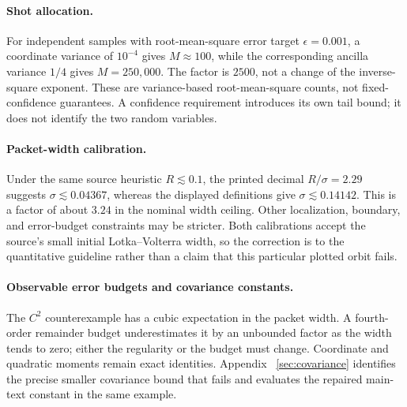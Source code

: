 \paragraph{Shot allocation.}
For independent samples with root-mean-square error target $\epsilon=0.001$,
a coordinate variance of $10^{-4}$ gives $M\approx100$, while the corresponding
ancilla variance $1/4$ gives $M=250{,}000$. The factor is $2500$, not a change
of the inverse-square exponent. These are variance-based root-mean-square
counts, not fixed-confidence guarantees. A confidence requirement introduces
its own tail bound; it does not identify the two random variables.

\paragraph{Packet-width calibration.}
Under the same source heuristic $R\lesssim0.1$, the printed decimal
$R/\sigma=2.29$ suggests $\sigma\lesssim0.04367$, whereas the displayed
definitions give $\sigma\lesssim0.14142$. This is a factor of about $3.24$
in the nominal width ceiling. Other localization, boundary, and error-budget
constraints may be stricter. Both calibrations accept the source's small
initial Lotka--Volterra width, so the correction is to the quantitative
guideline rather than a claim that this particular plotted orbit fails.

\paragraph{Observable error budgets and covariance constants.}
The $C^2$ counterexample has a cubic expectation in the packet width. A
fourth-order remainder budget underestimates it by an unbounded factor as the
width tends to zero; either the regularity or the budget must change.
Coordinate and quadratic moments remain exact identities. Appendix~
\ref{sec:covariance} identifies the precise smaller covariance bound that
fails and evaluates the repaired main-text constant in the same example.
